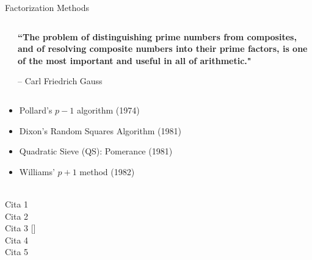 \documentclass[
	11pt, %
]{beamer}
\begin{document}
\begin{frame}{Factorization Methods}
  
  \begin{columns}[t]
    \begin{column}{.3\textwidth}
    \end{column}
    \begin{column}{.7\textwidth}
      \textbf{``The problem of distinguishing prime numbers from composites, and of resolving composite numbers into their prime factors, is one of the most important and useful in all of arithmetic."}
      
      \hfill-- Carl Friedrich Gauss
    \end{column}
  \end{columns}
  \vspace*{10pt}
  
  \begin{itemize}
  \item Pollard's $p-1$ algorithm (1974)
    \vspace*{10pt}
  \item Dixon's Random Squares Algorithm (1981)
    \vspace*{10pt}
  \item Quadratic Sieve (QS): Pomerance (1981)
    \vspace*{10pt}
  \item Williams' $p+1$ method (1982)
  \end{itemize}
\end{frame}

\begin{frame}
  \raisebox{-4ex}{$\to$}%
  \raisebox{-4ex}{$\to$}%
  \obeylines\\
  Cita 1 \citep{james}\\
  Cita 2 \citet*{8478368}\\
  Cita 3 \cite{8478368} []\\
  Cita 4 \citet{8478368}\\
  Cita 5 \citet[chap.~2]{8478368}\\
  \citep[chap.~2]{james}\\
  \citep[see][]{james}\\
  \citep[see][chap.~2]{james}\\
  \citep*{james}\\
  \citet{8478368,james}\\
  \citealp*{james}
\end{frame}
\end{document}
